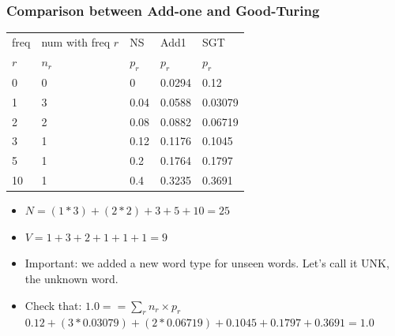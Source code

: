 \documentclass{beamer}
\begin{document}
\begin{frame}
\frametitle{Comparison between Add-one and Good-Turing}
\centering
\begin{tabular}{lllll}
\hline
freq & num with freq $r$ & NS    & Add1  & SGT   \\
$r$  & $n_r$ & $p_r$ & $p_r$ & $p_r$ \\
\hline
0  &  0 & 0    & 0.0294 & 0.12 \\
1  &  3 & 0.04 & 0.0588 & 0.03079 \\
2  &  2 & 0.08 & 0.0882 & 0.06719 \\
3  &  1 & 0.12 & 0.1176 & 0.1045 \\
5  &  1 & 0.2  & 0.1764 & 0.1797 \\
10 &  1 & 0.4  & 0.3235 & 0.3691 \\
\hline
\end{tabular}
\begin{itemize}[<+->]
\item $N = (1*3) + (2*2) + 3 + 5 + 10 = 25$
\item $V = 1 + 3 + 2 + 1 + 1 + 1 = 9$
\item Important: we added a new word type for unseen words. Let's call it UNK, the unknown word.
\item Check that: $1.0 == \sum_r n_r \times p_r$ \\
{\small $0.12 + (3 * 0.03079) + (2 * 0.06719) + 0.1045  + 0.1797 + 0.3691 = 1.0$ }
\end{itemize}
\end{frame}
\end{document}
